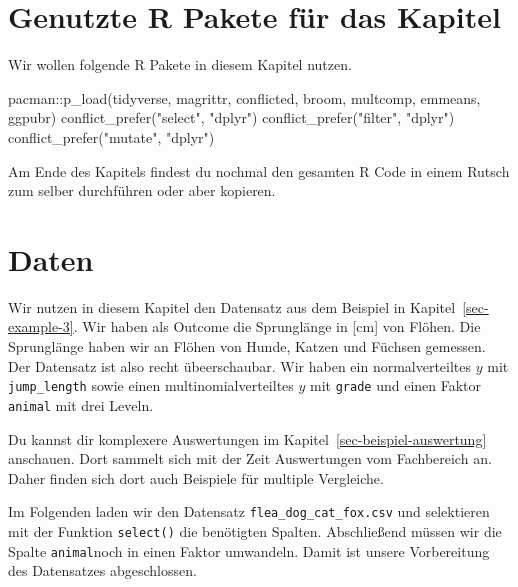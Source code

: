 \documentclass[
  letterpaper,
]{scrbook}
\newenvironment{Shaded}{\begin{snugshade}}{\end{snugshade}}
\newcommand{\FunctionTok}[1]{\textcolor[rgb]{0.28,0.35,0.67}{#1}}
\newcommand{\NormalTok}[1]{\textcolor[rgb]{0.00,0.23,0.31}{#1}}
\newcommand{\SpecialCharTok}[1]{\textcolor[rgb]{0.37,0.37,0.37}{#1}}
\newcommand{\StringTok}[1]{\textcolor[rgb]{0.13,0.47,0.30}{#1}}
\begin{document}
\hypertarget{genutzte-r-pakete-fuxfcr-das-kapitel-14}{%
\section{Genutzte R Pakete für das
Kapitel}\label{genutzte-r-pakete-fuxfcr-das-kapitel-14}}

Wir wollen folgende R Pakete in diesem Kapitel nutzen.

\begin{Shaded}
\begin{Highlighting}[]
\NormalTok{pacman}\SpecialCharTok{::}\FunctionTok{p\_load}\NormalTok{(tidyverse, magrittr, conflicted, broom,}
\NormalTok{               multcomp, emmeans, ggpubr)}
\FunctionTok{conflict\_prefer}\NormalTok{(}\StringTok{"select"}\NormalTok{, }\StringTok{"dplyr"}\NormalTok{)}
\FunctionTok{conflict\_prefer}\NormalTok{(}\StringTok{"filter"}\NormalTok{, }\StringTok{"dplyr"}\NormalTok{)}
\FunctionTok{conflict\_prefer}\NormalTok{(}\StringTok{"mutate"}\NormalTok{, }\StringTok{"dplyr"}\NormalTok{)}
\end{Highlighting}
\end{Shaded}

Am Ende des Kapitels findest du nochmal den gesamten R Code in einem
Rutsch zum selber durchführen oder aber kopieren.

\hypertarget{daten-2}{%
\section{Daten}\label{daten-2}}

Wir nutzen in diesem Kapitel den Datensatz aus dem Beispiel in
Kapitel~\ref{sec-example-3}. Wir haben als Outcome die Sprunglänge in
{[}cm{]} von Flöhen. Die Sprunglänge haben wir an Flöhen von Hunde,
Katzen und Füchsen gemessen. Der Datensatz ist also recht übeerschaubar.
Wir haben ein normalverteiltes \(y\) mit \texttt{jump\_length} sowie
einen multinomialverteiltes \(y\) mit \texttt{grade} und einen Faktor
\texttt{animal} mit drei Leveln.

Du kannst dir komplexere Auswertungen im
Kapitel~\ref{sec-beispiel-auswertung} anschauen. Dort sammelt sich mit
der Zeit Auswertungen vom Fachbereich an. Daher finden sich dort auch
Beispiele für multiple Vergleiche.

Im Folgenden laden wir den Datensatz \texttt{flea\_dog\_cat\_fox.csv}
und selektieren mit der Funktion \texttt{select()} die benötigten
Spalten. Abschließend müssen wir die Spalte \texttt{animal}noch in einen
Faktor umwandeln. Damit ist unsere Vorbereitung des Datensatzes
abgeschlossen.
\end{document}
